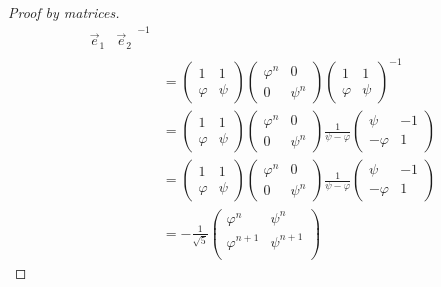 \begin{proof}[Proof by matrices]
\begin{align*}
{\begin{array}{c|c}
                \vec e_1 & \vec e_2
            \end{array}
        }^{-1} \\
        &=
        \begin{pmatrix}
            1 & 1 \\
            \varphi & \psi
        \end{pmatrix}
        \begin{pmatrix}
            \varphi^n & 0 \\
            0 & \psi^n
        \end{pmatrix}
        \begin{pmatrix}
            1 & 1 \\
            \varphi & \psi
        \end{pmatrix}^{-1} \\
        &=
        \begin{pmatrix}
            1 & 1 \\
            \varphi & \psi
        \end{pmatrix}
        \begin{pmatrix}
            \varphi^n & 0 \\
            0 & \psi^n
        \end{pmatrix}
        \frac 1 {\psi - \varphi}
        \begin{pmatrix}
            \psi & -1 \\
            -\varphi & 1
        \end{pmatrix} \\
        &=
        \begin{pmatrix}
            1 & 1 \\
            \varphi & \psi
        \end{pmatrix}
        \begin{pmatrix}
            \varphi^n & 0 \\
            0 & \psi^n
        \end{pmatrix}
        \frac 1 {\psi - \varphi}
        \begin{pmatrix}
            \psi & -1 \\
            -\varphi & 1
        \end{pmatrix} \\
        &=
        -\frac 1 {\sqrt 5}
        \begin{pmatrix}
            \varphi^n & \psi^n \\
            \varphi^{n + 1} & \psi^{n + 1} \\
        \end{pmatrix}

\end{align*}
\end{proof}
